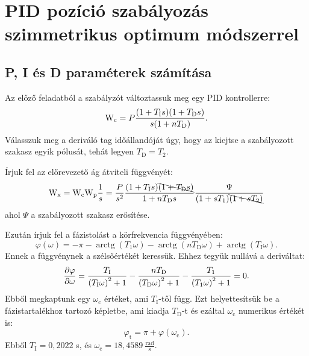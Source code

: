 \section{PID pozíció szabályozás szimmetrikus optimum módszerrel}

\subsection{P, I és D paraméterek számítása}

Az előző feladatból a szabályzót változtassuk meg egy PID kontrollerre:
\begin{equation}
	\mathrm{W}_\text{c} = P\frac{(1+T_\text{I}s)(1+T_\text{D}s)}{s(1+nT_\text{D})}.
\end{equation}
Válasszuk meg a deriváló tag időállandóját úgy, hogy az kiejtse a szabályozott szakasz
egyik pólusát, tehát legyen $T_\text{D} = T_2$.

Írjuk fel az előrevezető ág átviteli függvényét:
\begin{equation}
	\mathrm{W}_\text{x} = \mathrm{W}_\text{c}\mathrm{W}_\text{p}\frac{1}{s} = 
	\frac{P}{s^2}\frac{(1+T_\text{I}s)\bcancel{(1 + T_\text{D}s)}}{1 + nT_\text{D}s}\frac{\Psi}{(1 + sT_1)\bcancel{(1 + sT_2)}}
\end{equation}
ahol $\Psi$ a szabályozott szakasz erősítése.

Ezután írjuk fel a fázistolást a körfrekvencia függvényében:
\begin{equation}
	\varphi(\omega) = -\pi - \operatorname{arctg}(T_1\omega) - \operatorname{arctg}(nT_\text{D}\omega) + \operatorname{arctg}(T_\text{I}\omega).
\end{equation}
Ennek a függvénynek a szélsőértékét keressük. Ehhez tegyük nullává a deriváltat:
\begin{equation}
	\frac{\partial\varphi}{\partial\omega} = 
	\frac{T_\text{I}}{\left(T_\text{I}\omega\right)^2+1} - 
	\frac{nT_\text{D}}{\left(T_\text{D}\omega\right)^2+1} - 
	\frac{T_\text{1}}{\left(T_\text{1}\omega\right)^2+1} = 0.
\end{equation}
Ebből megkaptunk egy $\omega_\text{c}$ értéket, ami $T_\text{I}$-től függ.
Ezt helyettesítsük be a fázistartalékhoz tartozó képletbe, ami kiadja $T_\text{D}$-t és
ezáltal $\omega_\text{c}$ numerikus értékét is:
\begin{equation}
	\varphi_\text{t} = \pi + \varphi(\omega_\text{c}).
\end{equation}
Ebből $T_\text{I} = 0,2022$ s, és $\omega_\text{c} = 18,4589~\frac{\text{rad}}{\text{s}}$.

